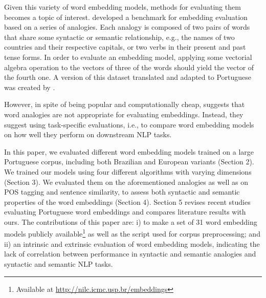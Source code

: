 Given this variety of word embedding models, methods for evaluating them becomes a topic of interest. \cite{mikolovetal2013} developed a benchmark for embedding evaluation based on a series of analogies. Each analogy is composed of two pairs of words that share some syntactic or semantic relationship, e.g., the names of two countries and their respective capitals, or two verbs in their present and past tense forms. In order to evaluate an embedding model, applying some vectorial algebra operation to the vectors of three of the words should yield the vector of the fourth one. A version of this dataset translated and adapted to Portuguese was created by \cite{rodriguesetal2016}. %

However, in spite of being popular and computationally cheap, \cite{repeval:16} suggests that word analogies are not appropriate for evaluating embeddings. Instead, they suggest using task-specific evaluations, i.e., to compare word embedding models on how well they perform on downstream NLP tasks.

In this paper, we evaluated different word embedding models trained on a large Portuguese corpus, including both Brazilian and European variants (Section 2). %
We trained our models using four different algorithms with varying dimensions (Section 3). We evaluated them on the aforementioned analogies as well as on POS tagging and sentence similarity, to assess both syntactic and semantic properties of the word embeddings (Section 4). Section 5 revises recent studies evaluating Portuguese word embeddings and compares literature results with ours. The contributions of this paper are: i) to make a set of 31 word embedding models publicly available\footnote{Available at \url{http://nilc.icmc.usp.br/embeddings}} as well as the script used for corpus preprocessing; and ii) an intrinsic and extrinsic evaluation of word embedding models, indicating the lack of correlation between performance in syntactic and semantic analogies and syntactic and semantic NLP tasks.

